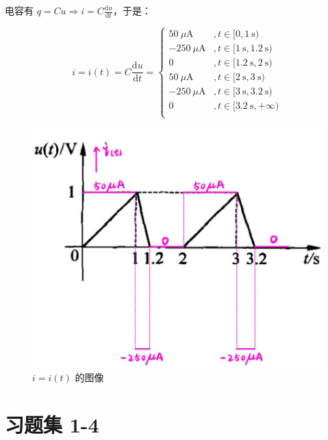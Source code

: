 \documentclass[UTF8]{report}
\def\uA{\ \mu\mathrm{A}}
\theoremstyle{MyLineTheoremStyle} %
\theoremstyle{MyBlockTheoremStyle} %
\theoremstyle{MySubsubsectionStyle} %
\begin{document}
电容有 $q = Cu \Longrightarrow i = C \frac{\mathrm{d} u }{\mathrm{d} t }$，于是：
\begin{center}\noindent\begin{minipage}{0.65\columnwidth}
    \begin{equation}
        i = i(t) = C \frac{\mathrm{d} u }{\mathrm{d} t } = 
        \begin{cases}
            50 \uA  &, t \in [0, 1 \ \mathrm{s}) \\ 
            -250 \uA       &, t \in [1 \ \mathrm{s}, 1.2 \ \mathrm{s}) \\ 
            0 &, t \in [1.2 \ \mathrm{s}, 2 \ \mathrm{s}) \\
            50   \uA    &, t \in [2 \ \mathrm{s}, 3 \ \mathrm{s}) \\
            -250 \uA  &, t \in [3 \ \mathrm{s}, 3.2 \ \mathrm{s}) \\
            0       &, t \in [3.2 \ \mathrm{s}, + \infty) \\
        \end{cases}
        \end{equation}
\end{minipage}\hfill\begin{minipage}{0.35\columnwidth}
\begin{figure}[H]\centering
\includegraphics[width=0.8\columnwidth]{assets/8/0f44a1b99db735634530b6af773398d5_720.jpg}
\caption{$i = i(t)$ 的图像}
\end{figure}
\end{minipage}\end{center}


\section{习题集 1-4}
\end{document}
